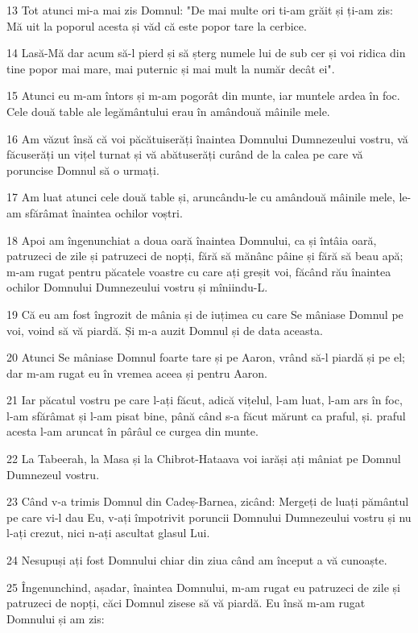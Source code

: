 \par 13 Tot atunci mi-a mai zis Domnul: "De mai multe ori ti-am grăit și ți-am zis: Mă uit la poporul acesta și văd că este popor tare la cerbice.
\par 14 Lasă-Mă dar acum să-l pierd și să șterg numele lui de sub cer și voi ridica din tine popor mai mare, mai puternic și mai mult la număr decât ei".
\par 15 Atunci eu m-am întors și m-am pogorât din munte, iar muntele ardea în foc. Cele două table ale legământului erau în amândouă mâinile mele.
\par 16 Am văzut însă că voi păcătuiserăți înaintea Domnului Dumnezeului vostru, vă făcuserăți un vițel turnat și vă abătuserăți curând de la calea pe care vă poruncise Domnul să o urmați.
\par 17 Am luat atunci cele două table și, aruncându-le cu amândouă mâinile mele, le-am sfărâmat înaintea ochilor voștri.
\par 18 Apoi am îngenunchiat a doua oară înaintea Domnului, ca și întâia oară, patruzeci de zile și patruzeci de nopți, fără să mănânc pâine și fără să beau apă; m-am rugat pentru păcatele voastre cu care ați greșit voi, făcând rău înaintea ochilor Domnului Dumnezeului vostru și mîniindu-L.
\par 19 Că eu am fost îngrozit de mânia și de iuțimea cu care Se mâniase Domnul pe voi, voind să vă piardă. Și m-a auzit Domnul și de data aceasta.
\par 20 Atunci Se mâniase Domnul foarte tare și pe Aaron, vrând să-l piardă și pe el; dar m-am rugat eu în vremea aceea și pentru Aaron.
\par 21 Iar păcatul vostru pe care l-ați făcut, adică vițelul, l-am luat, l-am ars în foc, l-am sfărâmat și l-am pisat bine, până când s-a făcut mărunt ca praful, și. praful acesta l-am aruncat în pârâul ce curgea din munte.
\par 22 La Tabeerah, la Masa și la Chibrot-Hataava voi iarăși ați mâniat pe Domnul Dumnezeul vostru.
\par 23 Când v-a trimis Domnul din Cadeș-Barnea, zicând: Mergeți de luați pământul pe care vi-l dau Eu, v-ați împotrivit poruncii Domnului Dumnezeului vostru și nu l-ați crezut, nici n-ați ascultat glasul Lui.
\par 24 Nesupuși ați fost Domnului chiar din ziua când am început a vă cunoaște.
\par 25 Îngenunchind, așadar, înaintea Domnului, m-am rugat eu patruzeci de zile și patruzeci de nopți, căci Domnul zisese să vă piardă. Eu însă m-am rugat Domnului și am zis:
